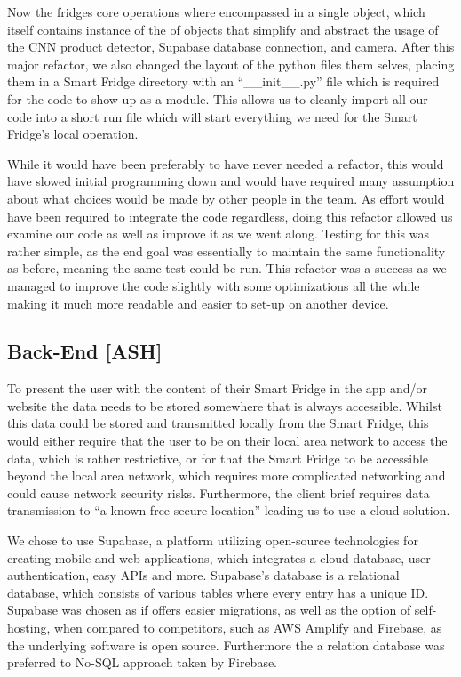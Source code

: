 Now the fridges core operations where encompassed in a single object, which itself contains instance of the of objects that simplify and abstract the usage of the CNN product detector, Supabase database connection, and camera.
After this major refactor, we also changed the layout of the python files them selves, placing them in a Smart Fridge directory with an “\_\_init\_\_.py” file which is required for the code to show up as a module.
This allows us to cleanly import all our code into a short run file which will start everything we need for the Smart Fridge's local operation.

While it would have been preferably to have never needed a refactor, this would have slowed initial programming down and would have required many assumption about what choices would be made by other people in the team.
As effort would have been required to integrate the code regardless, doing this refactor allowed us examine our code as well as improve it as we went along.
Testing for this was rather simple, as the end goal was essentially to maintain the same functionality as before, meaning the same test could be run.
This refactor was a success as we managed to improve the code slightly with some optimizations all the while making it much more readable and easier to set-up on another device.




\subsection{Back-End [ASH]}

To present the user with the content of their Smart Fridge in the app and/or website the data needs to be stored somewhere that is always accessible.
Whilst this data could be stored and transmitted locally from the Smart Fridge, this would either require that the user to be on their local area network to access the data, which is rather restrictive, or for that the Smart Fridge to be accessible beyond the local area network, which requires more complicated networking and could cause network security risks.
Furthermore, the client brief requires data transmission to “a known free secure location” leading us to use a cloud solution.

We chose to use Supabase, a platform utilizing open-source technologies for creating mobile and web applications, which integrates a cloud database, user authentication, easy APIs and more.
Supabase's database is a relational database, which consists of various tables where every entry has a unique ID.
Supabase was chosen as if offers easier migrations, as well as the option of self-hosting, when compared to competitors, such as AWS Amplify and Firebase, as the underlying software is open source.
Furthermore the a relation database was preferred to No-SQL approach taken by Firebase.

